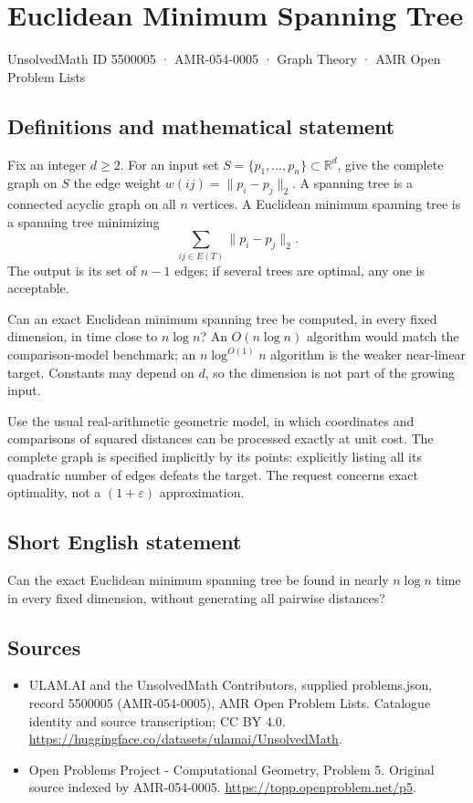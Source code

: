 \documentclass[11pt,a4paper]{article}
\begin{document}
\section*{Euclidean Minimum Spanning Tree}\label{5500005}
{\small UnsolvedMath ID 5500005 · AMR-054-0005 · Graph Theory · AMR Open Problem Lists}
\subsection{Definitions and mathematical statement}
Fix an integer $d\ge2$. For an input set $S=\{p_1,\ldots,p_n\}\subset
\mathbb R^d$, give the complete graph on $S$ the edge weight
$w(ij)=\|p_i-p_j\|_2$. A spanning tree is a connected acyclic graph on all
$n$ vertices. A Euclidean minimum spanning tree is a spanning tree
minimizing
\[
             \sum_{ij\in E(T)}\|p_i-p_j\|_2.
\]
The output is its set of $n-1$ edges; if several trees are optimal, any
one is acceptable.

Can an exact Euclidean minimum spanning tree be computed, in every fixed
dimension, in time close to $n\log n$? An $O(n\log n)$ algorithm would
match the comparison-model benchmark; an $n\log^{O(1)}n$ algorithm is
the weaker near-linear target. Constants may depend on $d$, so the
dimension is not part of the growing input.

Use the usual real-arithmetic geometric model, in which coordinates and
comparisons of squared distances can be processed exactly at unit cost.
The complete graph is specified implicitly by its points: explicitly
listing all its quadratic number of edges defeats the target. The
request concerns exact optimality, not a $(1+\varepsilon)$ approximation.
\subsection{Short English statement}
Can the exact Euclidean minimum spanning tree be found in nearly
$n\log n$ time in every fixed dimension, without generating all pairwise
distances?
\subsection{Sources}
\begin{itemize}
\item[S1] ULAM.AI and the UnsolvedMath Contributors, supplied problems.json, record 5500005 (AMR-054-0005), AMR Open Problem Lists. Catalogue identity and source transcription; CC BY 4.0.
\url{https://huggingface.co/datasets/ulamai/UnsolvedMath}.
\item[S2] Open Problems Project - Computational Geometry, Problem 5. Original source indexed by AMR-054-0005.
\url{https://topp.openproblem.net/p5}.
\end{itemize}
\end{document}
